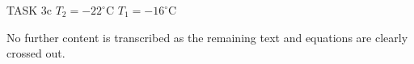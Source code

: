 TASK 3c  
\( T_2 = -22^\circ\text{C} \)  
\( T_1 = -16^\circ\text{C} \)  

No further content is transcribed as the remaining text and equations are clearly crossed out.